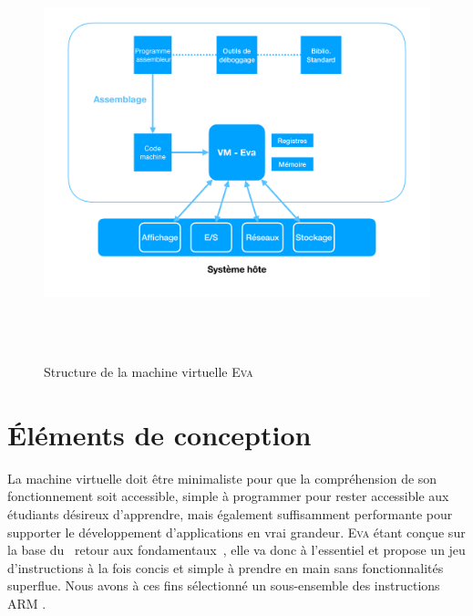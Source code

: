\documentclass[11pt,twoside]{article}
\makeatletter
\providecommand{\og}{\leavevmode\flqq~}%
\providecommand{\fg}{\ifdim\lastskip>\z@\unskip\fi~\frqq}%
\newcommand{\noun}[1]{\textsc{#1}}
\makeatother
\begin{document}
\begin{figure}[tb]
  \centering
  \includegraphics[width=12cm, height=12cm, keepaspectratio]{diagram1_graph.pdf}
  \caption{Structure de la machine virtuelle \noun{Eva}}
  \label{fig:diagram1}
\end{figure}


\section{Éléments de conception}

La machine virtuelle doit être minimaliste pour que la compréhension de son fonctionnement soit accessible, simple à programmer pour rester accessible aux étudiants désireux d'apprendre, mais également suffisamment performante pour supporter le développement d'applications en vrai grandeur. \noun{Eva} étant conçue sur la base du \og retour aux fondamentaux\fg , elle va donc à l'essentiel et propose un jeu d'instructions à la fois concis et simple à prendre en main sans fonctionnalités superflue. Nous avons à ces fins sélectionné un sous-ensemble des instructions ARM .
\end{document}
